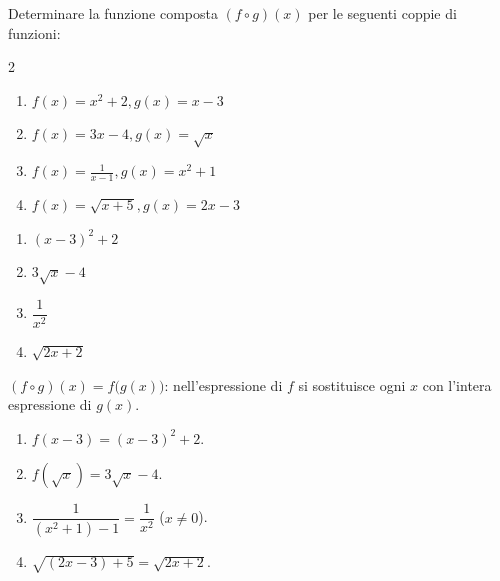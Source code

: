 \begin{question}[ID=5.5, subtitle={Funzione composta $(f\circ g)(x)$ — serie 5}, difficulty=media, tags={funzioni,composte}]
Determinare la funzione composta \( (f\circ g)(x) \) per le seguenti coppie di funzioni:

\begin{center}\begin{minipage}{0.92\linewidth}
\begin{multicols}{2}
\begin{enumerate}[leftmargin=3.2cm]
\item $f(x)=x^2+2, g(x)=x-3$
\item $f(x)=3x-4, g(x)=\sqrt{x}$
\item $f(x)=\frac{1}{x-1}, g(x)=x^2+1$
\item $f(x)=\sqrt{x+5}, g(x)=2x-3$
\end{enumerate}
\end{multicols}
\end{minipage}\end{center}
\begin{solution}
\begin{enumerate}
    \item $(x-3)^2+2$
    \item $3\sqrt x-4$
    \item $\dfrac{1}{x^2}$
    \item $\sqrt{2x+2}$
\end{enumerate}
\end{solution}
\begin{explanation}
$(f\circ g)(x)=f\big(g(x)\big)$: nell'espressione di $f$ si sostituisce ogni $x$ con l'intera espressione di $g(x)$.
\begin{enumerate}
    \item $f(x-3)=(x-3)^2+2$.
    \item $f(\sqrt x)=3\sqrt x-4$.
    \item $\dfrac{1}{(x^2+1)-1}=\dfrac{1}{x^2}$ ($x\neq0$).
    \item $\sqrt{(2x-3)+5}=\sqrt{2x+2}$.
\end{enumerate}
\end{explanation}
\end{question}


